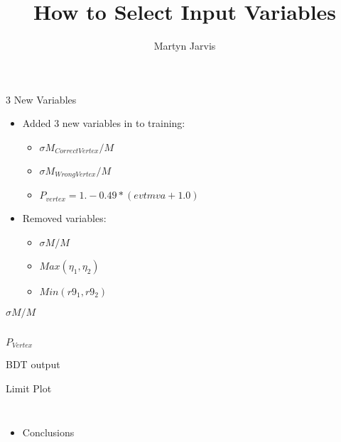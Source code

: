 \documentclass[t]{beamer}
\author{Martyn Jarvis}
\title[Input Variables]{How to Select Input Variables}
\begin{document}


\begin{frame}{3 New Variables}
  \begin{itemize}  
   \item Added 3 new variables in to training:
   \begin{itemize}  
     \item $\sigma M_{Correct Vertex} / M$
     \item $\sigma M_{Wrong Vertex} / M$
     \item $P_{vertex} =  1.-0.49*(evtmva+1.0)$
   \end{itemize}
   \item Removed variables:
   \begin{itemize}  
     \item $\sigma M / M$ 
     \item $Max(\eta_1,\eta_2)$
     \item $Min(r9_1,r9_2)$
   \end{itemize}
 \end{itemize}
\end{frame}

\begin{frame}{$\sigma M / M$}
  \begin{columns}[c]
  \end{columns}
\end{frame}

\begin{frame}{$P_{Vertex}$}
\end{frame}

\begin{frame}{BDT output}
\end{frame}

\begin{frame}{Limit Plot}
  \begin{columns}[c]
   \begin{itemize}  
     \item Conclusions
   \end{itemize}
  \end{columns}
\end{frame}
\end{document}

